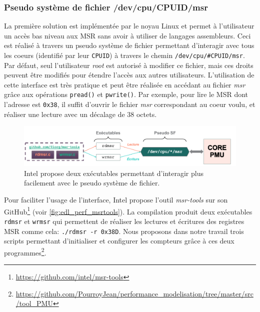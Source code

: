  
        \subsubsection{Pseudo système de fichier /dev/cpu/CPUID/msr}
            La première solution est implémentée par le noyau Linux et permet à l'utilisateur un accès bas niveau aux MSR sans avoir à utiliser de langages assembleurs. Ceci est réalisé à travers un pseudo système de fichier permettant d'interagir avec tous les coeurs (identifié par leur \verb|CPUID|) à travers le chemin \verb|/dev/cpu/#CPUID/msr|. Par défaut, seul l'utilisateur \textit{root} est autorisé à modifier ce fichier, mais ces droits peuvent être modifiés pour étendre l'accès aux autres utilisateurs. L'utilisation de cette interface est très pratique et peut être réalisée en accédant au fichier \textit{msr} grâce aux opérations \verb|pread()| et \verb|pwrite()|. Par exemple, pour lire le MSR dont l'adresse est \verb|0x38|, il suffit d'ouvrir le fichier \textit{msr} correspondant au coeur voulu, et réaliser une lecture avec un décalage de 38 octets.
            
            \begin{figure}[h!]
            \center
            \includegraphics[width=14cm]{images/edl_perf_msrtools.png}
            \caption{\label{fig:edl_perf_msrtools} Intel propose deux exécutables permettant d'interagir plus facilement avec le pseudo système de fichier.}
            \end{figure}
        
            Pour faciliter l'usage de l'interface, Intel propose l'outil \textit{msr-tools} sur son GitHub\footnote{\url{https://github.com/intel/msr-tools}} (voir \autoref{fig:edl_perf_msrtools}).  La compilation produit deux exécutables \verb|rdmsr| et \verb|wrmsr| qui permettent de réaliser les lectures et écritures des registres MSR comme cela: \verb|./rdmsr -r 0x38D|. Nous proposons dans notre travail trois scripts permettant d'initialiser et configurer les compteurs grâce à ces deux programmes\footnote{\url{https://github.com/PourroyJean/performance_modelisation/tree/master/src/tool_PMU}}. 
    
